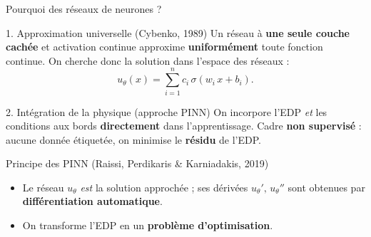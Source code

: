 \documentclass[11pt,aspectratio=43]{beamer}
\begin{document}
\begin{frame}{Pourquoi des réseaux de neurones ?}
  \begin{block}{1. Approximation universelle \textnormal{(Cybenko, 1989)}}
    Un réseau à \textbf{une seule couche cachée} et activation continue
    approxime \textbf{uniformément} toute fonction continue. On cherche donc
    la solution dans l'espace des réseaux :
    \[
      u_\theta(x)=\sum_{i=1}^{n} c_i\,\sigma(w_i\,x+b_i).
    \]
  \end{block}
  \begin{block}{2. Intégration de la physique \textnormal{(approche PINN)}}
    On incorpore l'EDP \emph{et} les conditions aux bords \textbf{directement}
    dans l'apprentissage. Cadre \textbf{non supervisé} : aucune donnée
    étiquetée, on minimise le \textbf{résidu} de l'EDP.
  \end{block}
\end{frame}

\begin{frame}{Principe des PINN \textnormal{\small (Raissi, Perdikaris \& Karniadakis, 2019)}}
  \begin{itemize}
    \item Le réseau $u_\theta$ \emph{est} la solution approchée ; ses dérivées
          $u_\theta',\,u_\theta''$ sont obtenues par \textbf{différentiation automatique}.
    \item On transforme l'EDP en un \textbf{problème d'optimisation}.
  \end{itemize}
  \vfill
  \centering
\end{frame}
\end{document}
